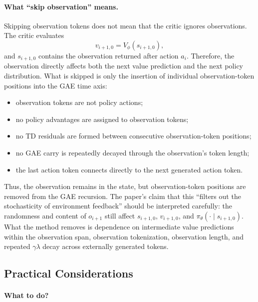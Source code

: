 \paragraph{What ``skip observation'' means.}
Skipping observation tokens does not mean that the critic ignores observations. The critic evaluates
\[
    v_{i+1,0}=V_\phi(s_{i+1,0}),
\]
and $s_{i+1,0}$ contains the observation returned after action $a_i$. Therefore, the observation directly affects both the next value prediction and the next policy distribution. What is skipped is only the insertion of individual observation-token positions into the GAE time axis:
\begin{itemize}
    \item observation tokens are not policy actions;
    \item no policy advantages are assigned to observation tokens;
    \item no TD residuals are formed between consecutive observation-token positions;
    \item no GAE carry is repeatedly decayed through the observation's token length;
    \item the last action token connects directly to the next generated action token.
\end{itemize}
Thus, the observation remains in the state, but observation-token positions are removed from the GAE recursion. The paper's claim that this ``filters out the stochasticity of environment feedback'' should be interpreted carefully: the randomness and content of $o_{i+1}$ still affect $s_{i+1,0}$, $v_{i+1,0}$, and $\pi_\theta(\cdot\mid s_{i+1,0})$. What the method removes is dependence on intermediate value predictions within the observation span, observation tokenization, observation length, and repeated $\gamma\lambda$ decay across externally generated tokens.

\subsection{Practical Considerations}

\paragraph{What to do?}

